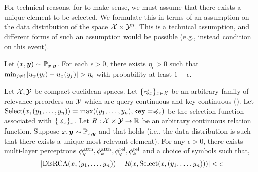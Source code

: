 \documentclass{article}
\begin{document}
For technical reasons, for  to make sense, we must assume that there exists a unique element to be selected. We formulate this in terms of an assumption on the data distribution of the space ${\mathcal{X}} \times {\mathcal{Y}}^n$. This is a technical assumption, and different forms of such an assumption would be possible (e.g., instead condition on this event).
\begin{assumption}\label{ass:select_unique}
  Let $(x, \bm{y}) \sim {\mathbb{P}}_{x,\bm{y}}$. For each $\epsilon > 0$, there exists $\eta_\epsilon > 0$ such that $\min_{j \neq i} \left\lvert u_x(y_i) - u_x(y_j)\right\rvert > \eta_\epsilon$ with probability at least $1 - \epsilon$.
\end{assumption}


\begin{theorem}\label{theorem:func_class}
  Let ${\mathcal{X}}, {\mathcal{Y}}$ be compact euclidean spaces. Let $\{\preccurlyeq_x\}_{x \in {\mathcal{X}}}$ be an arbitrary family of relevance preorders on ${\mathcal{Y}}$ which are query-continuous and key-continuous (). Let $\mathrm{Select}(x, (y_1, \ldots, y_n)) = \max((y_1, \ldots, y_n), \mathtt{key}=\preccurlyeq_x)$ be the selection function associated with $\{\preccurlyeq_x\}_{x}$. Let $R: {\mathcal{X}} \times {\mathcal{Y}} \to \mathbb{R}$ be an arbitrary continuous relation function. Suppose $x, \bm{y} \sim {\mathbb{P}}_{x, \bm{y}}$ and that  holds (i.e., the data distribution is such that there exists a unique most-relevant element). For any $\epsilon > 0$, there exists multi-layer perceptrons $\phi_q^{\mathrm{attn}}, \phi_k^{\mathrm{attn}}, \phi_q^{\mathrm{rel}}, \phi_k^{\mathrm{rel}}$ and a choice of symbols such that,
  \begin{equation*}
    \left\lvert\mathrm{DisRCA}(x, (y_1, \ldots, y_n)) - R(x, \mathrm{Select}(x, (y_1, \ldots, y_n)))\right\rvert < \epsilon
  \end{equation*}
\end{theorem}
\end{document}
